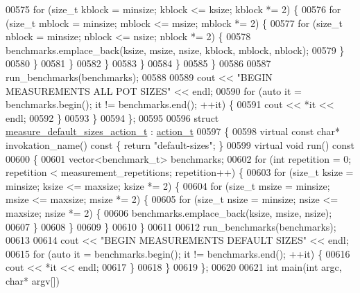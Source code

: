 \begin{DoxyCode}
{{{{{{{00575             \textcolor{keywordflow}{for} (\textcolor{keywordtype}{size\_t} kblock = minsize; kblock <= ksize; kblock *= 2) \{
00576               \textcolor{keywordflow}{for} (\textcolor{keywordtype}{size\_t} mblock = minsize; mblock <= msize; mblock *= 2) \{
00577                 \textcolor{keywordflow}{for} (\textcolor{keywordtype}{size\_t} nblock = minsize; nblock <= nsize; nblock *= 2) \{
00578                   benchmarks.emplace\_back(ksize, msize, nsize, kblock, mblock, nblock);
00579                 \}
00580               \}
00581             \}
00582           \}
00583         \}
00584       \}
00585     \}
00586 
00587     run\_benchmarks(benchmarks);
00588 
00589     cout << \textcolor{stringliteral}{"BEGIN MEASUREMENTS ALL POT SIZES"} << endl;
00590     \textcolor{keywordflow}{for} (\textcolor{keyword}{auto} it = benchmarks.begin(); it != benchmarks.end(); ++it) \{
00591       cout << *it << endl;
00592     \}
00593   \}
00594 \};
00595 
00596 \textcolor{keyword}{struct }\hyperlink{structmeasure__default__sizes__action__t}{measure\_default\_sizes\_action\_t} : \hyperlink{structaction__t}{action\_t}
00597 \{
00598   \textcolor{keyword}{virtual} \textcolor{keyword}{const} \textcolor{keywordtype}{char}* invokation\_name()\textcolor{keyword}{ const }\{ \textcolor{keywordflow}{return} \textcolor{stringliteral}{"default-sizes"}; \}
00599   \textcolor{keyword}{virtual} \textcolor{keywordtype}{void} run()\textcolor{keyword}{ const}
00600 \textcolor{keyword}{  }\{
00601     vector<benchmark\_t> benchmarks;
00602     \textcolor{keywordflow}{for} (\textcolor{keywordtype}{int} repetition = 0; repetition < measurement\_repetitions; repetition++) \{
00603       \textcolor{keywordflow}{for} (\textcolor{keywordtype}{size\_t} ksize = minsize; ksize <= maxsize; ksize *= 2) \{
00604         \textcolor{keywordflow}{for} (\textcolor{keywordtype}{size\_t} msize = minsize; msize <= maxsize; msize *= 2) \{
00605           \textcolor{keywordflow}{for} (\textcolor{keywordtype}{size\_t} nsize = minsize; nsize <= maxsize; nsize *= 2) \{
00606             benchmarks.emplace\_back(ksize, msize, nsize);
00607           \}
00608         \}
00609       \}
00610     \}
00611 
00612     run\_benchmarks(benchmarks);
00613 
00614     cout << \textcolor{stringliteral}{"BEGIN MEASUREMENTS DEFAULT SIZES"} << endl;
00615     \textcolor{keywordflow}{for} (\textcolor{keyword}{auto} it = benchmarks.begin(); it != benchmarks.end(); ++it) \{
00616       cout << *it << endl;
00617     \}
00618   \}
00619 \};
00620 
00621 \textcolor{keywordtype}{int} main(\textcolor{keywordtype}{int} argc, \textcolor{keywordtype}{char}* argv[])
}}}}}}}
\end{DoxyCode}
